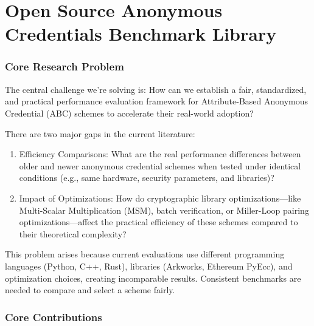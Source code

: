 \chapter{Open Source Anonymous Credentials Benchmark Library}



\subsection{Core Research Problem}
The central challenge we’re solving is: How can we establish a fair, standardized, and practical performance evaluation framework for Attribute-Based Anonymous Credential (ABC) schemes to accelerate their real-world adoption? 

There are two major gaps in the current literature:
\begin{enumerate}
    \item Efficiency Comparisons: What are the real performance differences between older and newer anonymous credential schemes when tested under identical conditions (e.g., same hardware, security parameters, and libraries)?

    \item Impact of Optimizations: How do cryptographic library optimizations—like Multi-Scalar Multiplication (MSM), batch verification, or Miller-Loop pairing optimizations—affect the practical efficiency of these schemes compared to their theoretical complexity?
    
\end{enumerate}
This problem arises because current evaluations use different programming languages (Python, C++, Rust), libraries (Arkworks, Ethereum PyEcc), and optimization choices, creating incomparable results. Consistent benchmarks are needed to compare and select a scheme fairly. 



\subsection{Core Contributions}

